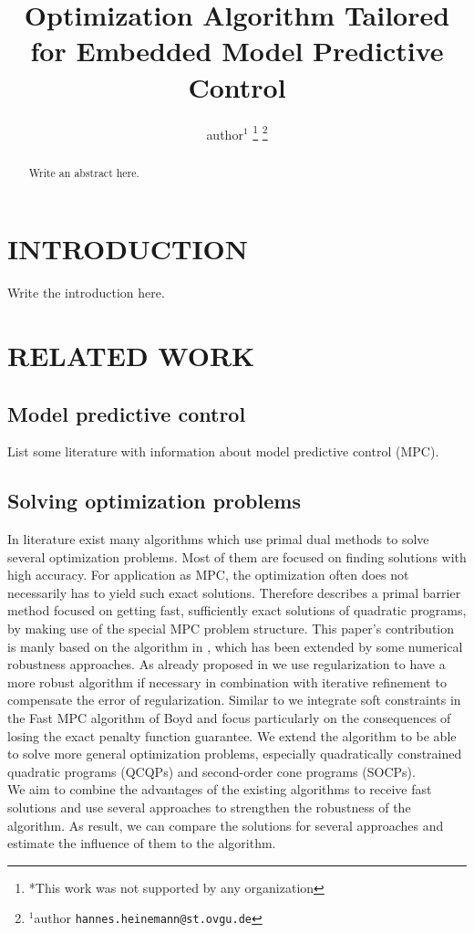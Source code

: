 \documentclass[letterpaper, 10 pt, conference]{ieeeconf}  %
\title{\LARGE \bf
Optimization Algorithm Tailored for Embedded Model Predictive Control
}
\author{author$^{1}$%
\thanks{*This work was not supported by any organization}%
\thanks{$^{1}$author
        {\tt\small hannes.heinemann@st.ovgu.de}}%
        }
\begin{document}
\maketitle
\thispagestyle{empty}
\pagestyle{empty}


\begin{abstract}

Write an abstract here.

\end{abstract}


\section{INTRODUCTION}

Write the introduction here.

\section{RELATED WORK}

\subsection{Model predictive control}

List some literature with information about model predictive control (MPC).

\subsection{Solving optimization problems}

In literature exist many algorithms which use primal dual methods to solve several optimization problems. Most of them are focused on finding solutions with high accuracy. For application as MPC, the optimization often does not necessarily has to yield such exact solutions. Therefore \cite{c1} describes a primal barrier method focused on getting fast, sufficiently exact solutions of quadratic programs, by making use of the special MPC problem structure. This paper's contribution is manly based on the algorithm in \cite{c1}, which has been extended by some numerical robustness approaches. As already proposed in \cite{c6} we use regularization to have a more robust algorithm  if necessary in combination with iterative refinement to compensate the error of regularization. Similar to \cite{c5} we integrate soft constraints in the Fast MPC algorithm of Boyd and focus particularly on the consequences of losing the exact penalty function guarantee. We extend the algorithm to be able to solve more general optimization problems, especially quadratically constrained quadratic programs (QCQPs) and second-order cone programs (SOCPs).\\
We aim to combine the advantages of the existing algorithms to receive fast solutions and use several approaches to strengthen the robustness of the algorithm. As result, we can compare the solutions for several approaches and estimate the influence of them to the algorithm.
\end{document}
